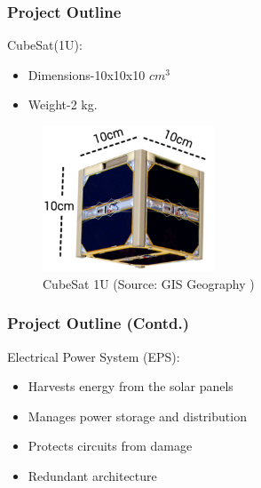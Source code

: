 \documentclass[aspectratio=169]{beamer}
\begin{document}
	\begin{frame}
		\frametitle{Project Outline	}
		
		\begin{minipage}{0.5\textwidth}
			CubeSat(1U):
			\begin{itemize}
				
				\item Dimensions-10x10x10 $cm^{3} $
				\item Weight-2 kg.
			\end{itemize}
		\end{minipage}
		\begin{minipage}{0.3\textwidth}
			\begin{figure}
				\includegraphics[width=5.1cm]{cubes1.png}
				\begin{center}
					\caption{CubeSat 1U (Source: GIS Geography )}
				\end{center}
				\label{fig:trac2}
				
			\end{figure}
			
		\end{minipage}
		
	\end{frame}

	
	\begin{frame}
		\frametitle{Project Outline (Contd.)}
		Electrical Power System (EPS):
		\begin{itemize}
			
			\item Harvests energy from the solar panels
			\item Manages power storage and distribution
			\item Protects circuits from damage
			\item Redundant architecture
		\end{itemize}
	\end{frame}
	
	
\end{document}
